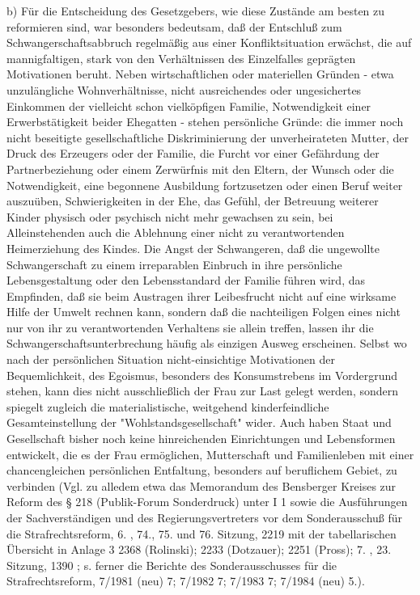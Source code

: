 \documentclass[12pt]{article}
\begin{document}
\syncleft
\begin{sourcepara}
b) Für die Entscheidung des Gesetzgebers, wie diese Zustände am besten zu reformieren sind, war besonders bedeutsam, daß der Entschluß zum Schwangerschaftsabbruch regelmäßig aus einer Konfliktsituation erwächst, die auf mannigfaltigen, stark von den Verhältnissen des Einzelfalles geprägten Motivationen beruht. Neben wirtschaftlichen oder materiellen Gründen - etwa unzulängliche Wohnverhältnisse, nicht ausreichendes oder ungesichertes Einkommen der vielleicht schon vielköpfigen Familie, Notwendigkeit einer Erwerbstätigkeit beider Ehegatten - stehen persönliche Gründe: die immer noch nicht beseitigte gesellschaftliche Diskriminierung der unverheirateten Mutter, der Druck des Erzeugers oder der Familie, die Furcht vor einer Gefährdung der Partnerbeziehung oder einem Zerwürfnis mit den Eltern, der Wunsch oder die Notwendigkeit, eine begonnene Ausbildung fortzusetzen oder einen Beruf weiter auszuüben, Schwierigkeiten in der Ehe, das Gefühl, der Betreuung weiterer Kinder physisch oder psychisch nicht mehr gewachsen zu sein, bei Alleinstehenden auch die Ablehnung einer nicht zu verantwortenden Heimerziehung des Kindes. Die Angst der Schwangeren, daß die ungewollte Schwangerschaft zu einem irreparablen Einbruch in ihre persönliche Lebensgestaltung oder den Lebensstandard der Familie führen wird, das Empfinden, daß sie beim Austragen ihrer Leibesfrucht nicht auf eine wirksame Hilfe der Umwelt rechnen kann, sondern daß die nachteiligen Folgen eines nicht nur von ihr zu verantwortenden Verhaltens sie allein treffen, lassen ihr die Schwangerschaftsunterbrechung häufig als einzigen Ausweg erscheinen. Selbst wo nach der persönlichen Situation nicht-einsichtige Motivationen der Bequemlichkeit, des Egoismus, besonders des Konsumstrebens im Vordergrund stehen, kann dies nicht ausschließlich der Frau zur Last gelegt werden, sondern spiegelt zugleich die materialistische, weitgehend kinderfeindliche Gesamteinstellung der "Wohlstandsgesellschaft" wider. Auch haben Staat und Gesellschaft bisher noch keine hinreichenden Einrichtungen und Lebensformen entwickelt, die es der Frau ermöglichen, Mutterschaft und Familienleben mit einer chancengleichen persönlichen Entfaltung, besonders auf beruflichem Gebiet, zu verbinden (Vgl. zu alledem etwa das Memorandum des Bensberger Kreises zur Reform des § 218 \abbrStGB{} (Publik-Forum Sonderdruck) unter I 1 sowie die Ausführungen der Sachverständigen und des Regierungsvertreters vor dem Sonderausschuß für die Strafrechtsreform, 6. \abbrWp{}, 74., 75. und 76. Sitzung, \abbrStenBer{} \abbrS{} 2219 mit der tabellarischen Übersicht in Anlage 3 \abbrS{} 2368 (Rolinski); \abbrS{} 2233 (Dotzauer); \abbrS{} 2251 \abbrFF{} (Pross); 7. \abbrWp{}, 23. Sitzung, \abbrStenBer{} \abbrS{} 1390 \abbrF{}; s. ferner die Berichte des Sonderausschusses für die Strafrechtsreform, \abbrBTDrucks{} 7/1981 (neu) \abbrS{} 7; 7/1982 \abbrS{} 7; 7/1983 \abbrS{} 7; 7/1984 (neu) \abbrS{} 5.).
\end{sourcepara}
\end{document}
